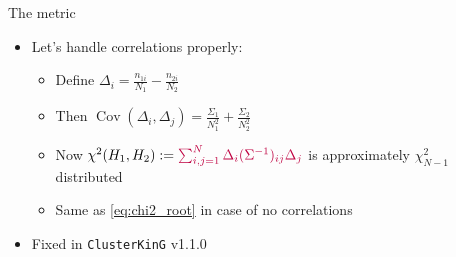 \begin{frame}{The metric}
	\begin{itemize}
		\item Let's handle correlations properly: 
		\begin{itemize}
			\item Define $\Delta_i=\displaystyle\frac{n_{1i}}{N_1}-\frac{n_{2i}}{N_2}$
			\item Then $\operatorname{Cov}(\Delta_i, \Delta_j)=\displaystyle \frac{\Sigma_1}{N_1^2} + \frac{\Sigma_2}{N_2^2}$
			\item Now $\chi^2(H_1,H_2):= {\color{purple}\sum_{i,j=1}^N \Delta_i (\Sigma^{-1})_{ij} \Delta_j}$ is approximately $\chi^2_{N-1}$ distributed
			\item Same as \eqref{eq:chi2_root} in case of no correlations
		\end{itemize}
		\item Fixed in \texttt{ClusterKinG} v1.1.0
	\end{itemize}
\end{frame}

